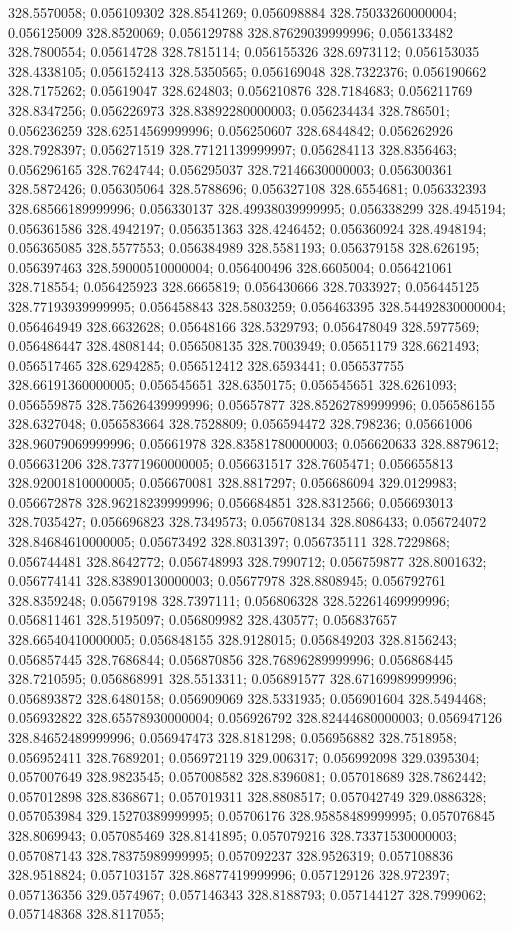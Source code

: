 328.5570058; 0.056109302 328.8541269; 0.056098884 328.75033260000004; 0.056125009 328.8520069; 0.056129788 328.87629039999996; 0.056133482 328.7800554; 0.05614728 328.7815114; 0.056155326 328.6973112; 0.056153035 328.4338105; 0.056152413 328.5350565; 0.056169048 328.7322376; 0.056190662 328.7175262; 0.05619047 328.624803; 0.056210876 328.7184683; 0.056211769 328.8347256; 0.056226973 328.83892280000003; 0.056234434 328.786501; 0.056236259 328.62514569999996; 0.056250607 328.6844842; 0.056262926 328.7928397; 0.056271519 328.77121139999997; 0.056284113 328.8356463; 0.056296165 328.7624744; 0.056295037 328.72146630000003; 0.056300361 328.5872426; 0.056305064 328.5788696; 0.056327108 328.6554681; 0.056332393 328.68566189999996; 0.056330137 328.49938039999995; 0.056338299 328.4945194; 0.056361586 328.4942197; 0.056351363 328.4246452; 0.056360924 328.4948194; 0.056365085 328.5577553; 0.056384989 328.5581193; 0.056379158 328.626195; 0.056397463 328.59000510000004; 0.056400496 328.6605004; 0.056421061 328.718554; 0.056425923 328.6665819; 0.056430666 328.7033927; 0.056445125 328.77193939999995; 0.056458843 328.5803259; 0.056463395 328.54492830000004; 0.056464949 328.6632628; 0.05648166 328.5329793; 0.056478049 328.5977569; 0.056486447 328.4808144; 0.056508135 328.7003949; 0.05651179 328.6621493; 0.056517465 328.6294285; 0.056512412 328.6593441; 0.056537755 328.66191360000005; 0.056545651 328.6350175; 0.056545651 328.6261093; 0.056559875 328.75626439999996; 0.05657877 328.85262789999996; 0.056586155 328.6327048; 0.056583664 328.7528809; 0.056594472 328.798236; 0.05661006 328.96079069999996; 0.05661978 328.83581780000003; 0.056620633 328.8879612; 0.056631206 328.73771960000005; 0.056631517 328.7605471; 0.056655813 328.92001810000005; 0.056670081 328.8817297; 0.056686094 329.0129983; 0.056672878 328.96218239999996; 0.056684851 328.8312566; 0.056693013 328.7035427; 0.056696823 328.7349573; 0.056708134 328.8086433; 0.056724072 328.84684610000005; 0.05673492 328.8031397; 0.056735111 328.7229868; 0.056744481 328.8642772; 0.056748993 328.7990712; 0.056759877 328.8001632; 0.056774141 328.83890130000003; 0.05677978 328.8808945; 0.056792761 328.8359248; 0.05679198 328.7397111; 0.056806328 328.52261469999996; 0.056811461 328.5195097; 0.056809982 328.430577; 0.056837657 328.66540410000005; 0.056848155 328.9128015; 0.056849203 328.8156243; 0.056857445 328.7686844; 0.056870856 328.76896289999996; 0.056868445 328.7210595; 0.056868991 328.5513311; 0.056891577 328.67169989999996; 0.056893872 328.6480158; 0.056909069 328.5331935; 0.056901604 328.5494468; 0.056932822 328.65578930000004; 0.056926792 328.82444680000003; 0.056947126 328.84652489999996; 0.056947473 328.8181298; 0.056956882 328.7518958; 0.056952411 328.7689201; 0.056972119 329.006317; 0.056992098 329.0395304; 0.057007649 328.9823545; 0.057008582 328.8396081; 0.057018689 328.7862442; 0.057012898 328.8368671; 0.057019311 328.8808517; 0.057042749 329.0886328; 0.057053984 329.15270389999995; 0.05706176 328.95858489999995; 0.057076845 328.8069943; 0.057085469 328.8141895; 0.057079216 328.73371530000003; 0.057087143 328.78375989999995; 0.057092237 328.9526319; 0.057108836 328.9518824; 0.057103157 328.86877419999996; 0.057129126 328.972397; 0.057136356 329.0574967; 0.057146343 328.8188793; 0.057144127 328.7999062; 0.057148368 328.8117055; 